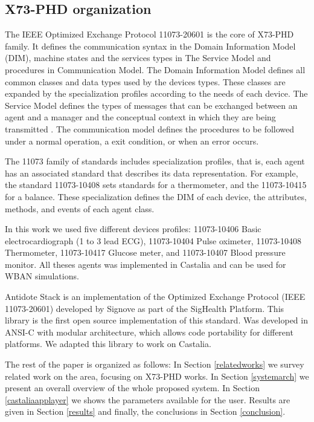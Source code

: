 \subsection{X73-PHD organization}

The IEEE Optimized Exchange
Protocol 11073-20601 is the core of X73-PHD family. It defines the communication syntax in the Domain Information Model (DIM), machine states and the services types in The Service Model and procedures in Communication Model. 
The Domain Information Model defines all common classes and data types used by the devices types. These classes are expanded by the specialization profiles according to the needs of each device. The Service Model defines the types of messages that can be exchanged between an agent and a manager and the conceptual context in which they are being transmitted \cite{b17}. The communication model defines the procedures to be followed under a normal operation, a exit condition, or when an error occurs.

The 11073 family of standards includes specialization profiles, that is, each agent has an associated standard that describes its data representation. For example, the standard 11073-10408 sets standards for a thermometer,
and the 11073-10415 for a balance. These specialization defines the DIM of each device, the attributes, methods, and events of each agent class.

In this work we used five different devices profiles: 11073-10406 Basic electrocardiograph (1 to 3 lead ECG), 11073-10404 Pulse oximeter, 11073-10408 Thermometer, 
11073-10417 Glucose meter, and 11073-10407 Blood pressure monitor. All theses agents was implemented in Castalia and can be used for WBAN simulations.

Antidote Stack is an implementation of the Optimized Exchange Protocol (IEEE 11073-20601) developed by Signove as part of the SigHealth Platform. This library is the first open source implementation of this standard. Was developed in ANSI-C with modular architecture, which allows code portability for different platforms. We adapted this library to work on Castalia.

The rest of the paper is organized as follows: In Section \ref{relatedworks} we survey related work on the area, focusing on X73-PHD works. In Section \ref{systemarch} we present an overall overview of the whole proposed system. In Section \ref{castaliaapplayer} we shows the parameters available for the user. Results are given in Section \ref{results} and finally, the conclusions in Section \ref{conclusion}.